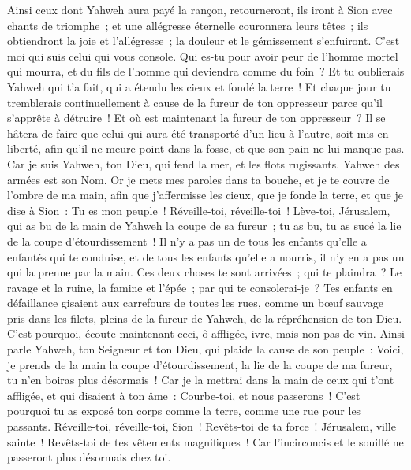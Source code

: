 \begin{multicols}{2}
Ainsi ceux dont Yahweh aura payé la rançon, retourneront, ils iront à Sion avec chants de triomphe~; et une allégresse éternelle couronnera leurs têtes~; ils obtiendront la joie et l'allégresse~; la douleur et le gémissement s'enfuiront.
C'est moi qui suis celui qui vous console. Qui es-tu pour avoir peur de l'homme mortel qui mourra, et du fils de l'homme qui deviendra comme du foin~?
Et tu oublierais Yahweh qui t'a fait, qui a étendu les cieux et fondé la terre~! Et chaque jour tu tremblerais continuellement à cause de la fureur de ton oppresseur parce qu'il s'apprête à détruire~! Et où est maintenant la fureur de ton oppresseur~?
Il se hâtera de faire que celui qui aura été transporté d'un lieu à l'autre, soit mis en liberté, afin qu'il ne meure point dans la fosse, et que son pain ne lui manque pas.
Car je suis Yahweh, ton Dieu, qui fend la mer, et les flots rugissants. Yahweh des armées est son Nom.
Or je mets mes paroles dans ta bouche, et je te couvre de l'ombre de ma main, afin que j'affermisse les cieux, que je fonde la terre, et que je dise à Sion~: Tu es mon peuple~!
Réveille-toi, réveille-toi~! Lève-toi, Jérusalem, qui as bu de la main de Yahweh la coupe de sa fureur~; tu as bu, tu as sucé la lie de la coupe d'étourdissement~!
Il n'y a pas un de tous les enfants qu'elle a enfantés qui te conduise, et de tous les enfants qu'elle a nourris, il n'y en a pas un qui la prenne par la main.
Ces deux choses te sont arrivées~; qui te plaindra~? Le ravage et la ruine, la famine et l'épée~; par qui te consolerai-je~?
Tes enfants en défaillance gisaient aux carrefours de toutes les rues, comme un bœuf sauvage pris dans les filets, pleins de la fureur de Yahweh, de la répréhension de ton Dieu.
C'est pourquoi, écoute maintenant ceci, ô affligée, ivre, mais non pas de vin.
Ainsi parle Yahweh, ton Seigneur et ton Dieu, qui plaide la cause de son peuple~: Voici, je prends de la main la coupe d'étourdissement, la lie de la coupe de ma fureur, tu n'en boiras plus désormais~!
Car je la mettrai dans la main de ceux qui t'ont affligée, et qui disaient à ton âme~: Courbe-toi, et nous passerons~! C'est pourquoi tu as exposé ton corps comme la terre, comme une rue pour les passants.
\VerseOne{}Réveille-toi, réveille-toi, Sion~! Revêts-toi de ta force~! Jérusalem, ville sainte~! Revêts-toi de tes vêtements magnifiques~! Car l'incirconcis et le souillé ne passeront plus désormais chez toi. 

\end{multicols}

